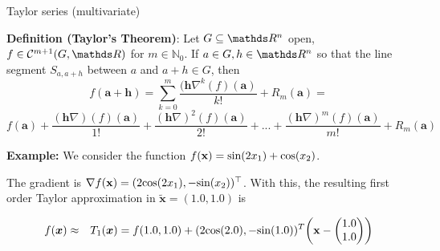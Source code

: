 \begin{vbframe}{Taylor series (multivariate)}
    \vspace*{0.2cm}
    
    \textbf{Definition (Taylor's Theorem)}: Let $G \subseteq \R^{n}$ open, $f \in \mathcal{C}^{m+1}(G,\R)$ for $m \in \mathbb{N}_0$.
    If $a \in G, h \in \R^{n}$ so that the line segment $S_{a, a+h}$ between $a$ and $a+h \in G$, then
    $$f(\bm{a+h}) = \sum_{k=0}^{m} \frac{(\bm{h}\nabla^{k}(f)(\bm{a})}{k!} + R_{m}(\bm{a}) = $$
    $$f(\bm{a}) + \frac{(\bm{h}\nabla)(f)(\bm{a})}{1!} + \frac{(\bm{h}\nabla)^{2}(f)(\bm{a})}{2!} + ... + \frac{(\bm{h}\nabla)^{m}(f)(\bm{a})}{m!} + R_{m}(\bm{a})$$
    
  

  \framebreak

  
  \textbf{Example: } We consider the function $f(\mathbf{x}) = \text{sin}(2x_1) + \text{cos}(x_2)$.
  
  \vspace*{0.2cm}
  
  The gradient is $\nabla f(\mathbf{x}) = (2\text{cos}(2x_1), -\text{sin}(x_2))^\top$. With this, the resulting first order Taylor approximation in $\bm{\tilde x} = (1.0, 1.0)$ is
  \vspace*{-0.5cm}
  
  \begin{eqnarray*}
  f(\bm{x}) &\approx& T_1(\bm{x}) = f(1.0, 1.0) + (2\text{cos}(2.0), -\text{sin}(1.0))^T\biggl(\mathbf{x}- \begin{pmatrix}1.0 \\ 1.0 \end{pmatrix}\biggr) 
  \end{eqnarray*}
  

\end{vbframe}
